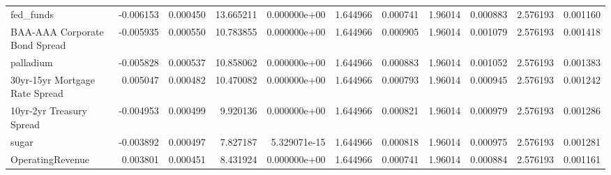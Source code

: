 \documentclass[12pt,a4paper,english]{article}
\begin{document}
{{\begin{tabular}{@{}lrrrrrrrrrr@{}}
			fed\_funds                     & -0.006153                & 0.000450                    & 13.665211                 & 0.000000e+00                             & 1.644966                      & 0.000741                      & 1.96014                      & 0.000883                     & 2.576193                     & 0.001160                     \\
			BAA-AAA Corporate Bond Spread  & -0.005935                & 0.000550                    & 10.783855                 & 0.000000e+00                             & 1.644966                      & 0.000905                      & 1.96014                      & 0.001079                     & 2.576193                     & 0.001418                     \\
			palladium                      & -0.005828                & 0.000537                    & 10.858062                 & 0.000000e+00                             & 1.644966                      & 0.000883                      & 1.96014                      & 0.001052                     & 2.576193                     & 0.001383                     \\
			30yr-15yr Mortgage Rate Spread & 0.005047                 & 0.000482                    & 10.470082                 & 0.000000e+00                             & 1.644966                      & 0.000793                      & 1.96014                      & 0.000945                     & 2.576193                     & 0.001242                     \\
			10yr-2yr Treasury Spread       & -0.004953                & 0.000499                    & 9.920136                  & 0.000000e+00                             & 1.644966                      & 0.000821                      & 1.96014                      & 0.000979                     & 2.576193                     & 0.001286                     \\
			sugar                          & -0.003892                & 0.000497                    & 7.827187                  & 5.329071e-15                             & 1.644966                      & 0.000818                      & 1.96014                      & 0.000975                     & 2.576193                     & 0.001281                     \\
			OperatingRevenue               & 0.003801                 & 0.000451                    & 8.431924                  & 0.000000e+00                             & 1.644966                      & 0.000741                      & 1.96014                      & 0.000884                     & 2.576193                     & 0.001161                     \\

\end{tabular}}}
\end{document}
